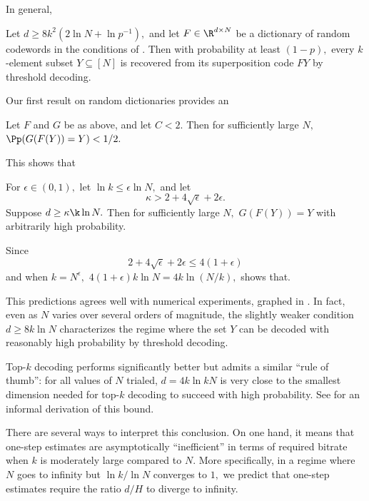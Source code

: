In general,

\begin{corollary}
	Let $d \ge 8 k^2 (2 \ln N + \ln p^{-1}),$ and let $F \in \R^{d \times N}$ be a dictionary of random codewords in the conditions of . Then with probability at least $(1 - p),$ every $k$-element subset $Y \subseteq [N]$ is recovered from its superposition code $F Y$ by threshold decoding. \label{prop:quadratic-condition}
\end{corollary}

Our first result on random dictionaries provides an

\begin{proposition} \label{prop:necessary-cond}
    Let $F$ and $G$ be as above, and let $C < 2.$ Then for sufficiently large $N,$ $\Pp(G(F(Y)) = Y) < 1/2.$
\end{proposition}

This shows that

\begin{proposition} \label{prop:sufficient-cond}
	For $\epsilon \in (0, 1),$ let $\ln k \le \epsilon \ln N,$ and let
	$$
	\kappa > 2 + 4 \sqrt \epsilon + 2 \epsilon.
	$$
	Suppose $d \ge \kappa \k \ln N.$ Then for sufficiently large $N,$ $G(F(Y)) = Y$ with arbitrarily high probability.
\end{proposition}

Since
$$
2 + 4 \sqrt \epsilon + 2 \epsilon \le 4(1  + \epsilon)
$$
and when $k = N^\epsilon,$ $4(1 + \epsilon) k \ln N = 4 k \ln (N / k),$  shows that.

This predictions agrees well with numerical experiments, graphed in . In fact, even as $N$ varies over several orders of magnitude, the slightly weaker condition $d \ge 8 k \ln N$ characterizes the regime where the set $Y$ can be decoded with reasonably high probability by threshold decoding.

Top-$k$ decoding performs significantly better but admits a similar ``rule of thumb'': for all values of $N$ trialed, $d = 4 k \ln k N$ is very close to the smallest dimension needed for top-$k$ decoding to succeed with high probability. See  for an informal derivation of this bound.

There are several ways to interpret this conclusion. On one hand, it means that one-step estimates are asymptotically ``inefficient'' in terms of required bitrate when $k$ is moderately large compared to $N.$ More specifically, in a regime where $N$ goes to infinity but $\ln k / \ln N$ converges to $1,$ we predict that one-step estimates require the ratio $d/H$ to diverge to infinity.

